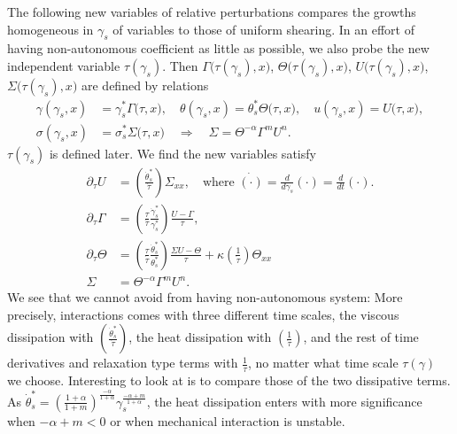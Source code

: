 \documentclass[a4paper,11pt]{article}
\theoremstyle{remark}
\begin{document}
The following new variables of relative perturbations compares the growths homogeneous in $\gamma_s$ of variables to those of uniform shearing. In an effort of having non-autonomous coefficient as little as possible, we also probe the new independent variable $\tau(\gamma_s)$. Then $\Gamma\big(\tau(\gamma_s),x\big)$, $\Theta\big(\tau(\gamma_s),x\big)$, $U\big(\tau(\gamma_s),x\big)$, $\Sigma\big(\tau(\gamma_s),x\big)$ are defined by relations
\begin{equation}
 \begin{aligned}
  \gamma(\gamma_s,x) &= \gamma^*_s\Gamma\big(\tau,x\big), \quad \theta(\gamma_s,x) = \theta^*_s\Theta\big(\tau,x\big), \quad u(\gamma_s,x)=U\big(\tau,x\big),\\
  \sigma(\gamma_s,x) &= \sigma^*_s\Sigma\big(\tau,x\big) \quad \Longrightarrow \quad \Sigma = \Theta^{-\alpha}\Gamma^m U^n.
 \end{aligned}
\end{equation}
$\tau( \gamma _s)$ is defined later. We find the new variables satisfy
\begin{equation*}
 \begin{aligned}
  \partial_\tau U &= \left(\frac{\dot\theta^*_s}{\dot{\tau}}\right) \Sigma_{xx}, \quad \text{where $\dot{(\cdot)}=\frac{d}{d\gamma_s}(\cdot)=\frac{d}{dt}(\cdot)$.} \\
  \partial_\tau \Gamma &= \left(\frac{\tau}{\dot\tau} \frac{\dot\gamma^*_s}{\gamma^*_s}\right) \frac{U-\Gamma}{\tau},\\
  \partial_\tau \Theta &= \left(\frac{\tau}{\dot\tau} \frac{\dot\theta^*_s}{\theta^*_s}\right) \frac{\Sigma U - \Theta}{\tau} + \kappa\left(\frac{1}{\dot\tau}\right) \Theta_{xx}\\
  \Sigma&=\Theta^{-\alpha}\Gamma^m U^n.
 \end{aligned}
\end{equation*}
We see that we cannot avoid from having non-autonomous system: More precisely, interactions comes with three different time scales, the viscous dissipation with $\left(\frac{\dot\theta^*_s}{\dot{\tau}}\right)$, the heat dissipation with $\left(\frac{1}{\dot\tau}\right)$, and the rest of time derivatives and relaxation type terms with $\frac{1}{\tau}$, no matter what time scale $\tau(\gamma)$ we choose. Interesting to look at is to compare those of the two dissipative terms. As $\dot\theta^*_s = \left( \frac{1+\alpha}{1+m}\right)^{\frac{-\alpha}{1+\alpha}}\gamma_s^{\frac{-\alpha+m}{1+\alpha}}$, the heat dissipation enters with more significance when $-\alpha+m<0$ or when mechanical interaction is unstable.
\end{document}
